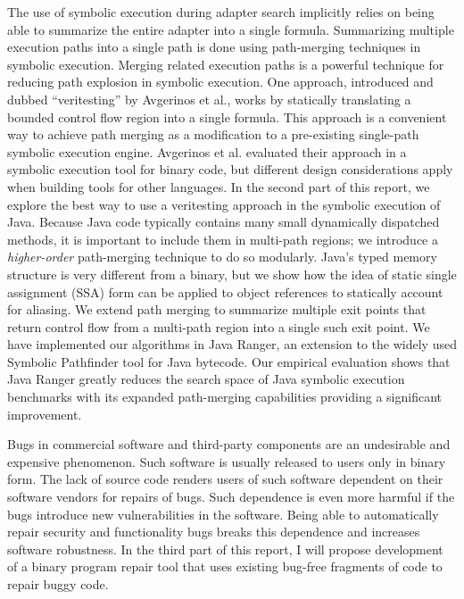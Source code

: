 The use of symbolic execution during adapter search implicitly relies on being able to summarize the entire
adapter into a single formula.
%
Summarizing multiple execution paths into a single path is done using path-merging techniques in symbolic execution.
%
Merging related execution paths is a powerful technique for reducing
path explosion in symbolic execution.
%
One approach, introduced and dubbed ``veritesting'' by Avgerinos et
al., works by statically translating a bounded control flow region
into a single formula.
%
This approach is a convenient way to achieve path merging as a
modification to a pre-existing single-path symbolic execution engine.
%
Avgerinos et al. evaluated their approach in a symbolic execution tool
for binary code, but different design considerations apply when
building tools for other languages.
%
In the second part of this report, we explore the best way to use a veritesting approach in
the symbolic execution of Java.
%
Because Java code typically contains many small dynamically dispatched
methods, it is important to include them in multi-path regions; we
introduce a {\em higher-order} path-merging technique to do so
modularly.
%
Java's typed memory structure is very different from a binary, but we
show how the idea of static single assignment (SSA) form can be
applied to object references to statically account for aliasing.
%
We extend path merging to summarize multiple exit points that return control flow from a multi-path region
into a single such exit point.
%
We have implemented our algorithms in Java Ranger, an extension to the
widely used Symbolic Pathfinder tool for Java bytecode.
%
Our empirical evaluation shows that Java Ranger greatly reduces the
search space of Java symbolic execution benchmarks with its expanded
path-merging capabilities providing a significant improvement.

Bugs in commercial software and third-party components are an undesirable and expensive phenomenon.
%
Such software is usually released to users only in binary form.
%
The lack of source code renders users of such software dependent on their software vendors for repairs of bugs.
%
Such dependence is even more harmful if the bugs introduce new vulnerabilities in the software.
%
Being able to automatically repair security and functionality bugs breaks this dependence and increases software robustness.
%
In the third part of this report, I will propose development of a binary program repair tool that uses
existing bug-free fragments of code to repair buggy code.